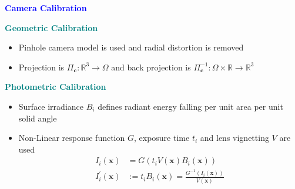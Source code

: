 \documentclass[aspectratio=169]{beamer}
\begin{document}
\begin{frame}{\textcolor{blue}{\textbf{Camera Calibration}}}
	\vspace{-0.5cm}
	
	\begin{block}{\textbf{\textcolor{teal}{Geometric Calibration}}}
	\begin{itemize}
			\item Pinhole camera model is used and radial distortion is removed
			\item Projection is $\Pi_{\mathbf{c}}: \mathbb{R}^3 \rightarrow \Omega$ and back projection is $\Pi_{\mathbf{c}}^{-1}: \Omega \times \mathbb{R} \rightarrow \mathbb{R}^3$
	\end{itemize}
	\end{block}

	\begin{block}{\textbf{\textcolor{teal}{Photometric Calibration}}}
	\begin{itemize}
			\item Surface irradiance $B_i$ defines radiant energy falling per unit area per unit solid angle
			\item Non-Linear response function $G$, exposure time $t_i$ and lens vignetting $V$ are used
			\begin{equation}
				\begin{aligned}
					I_i(\mathbf{x})&=G\left(t_i V(\mathbf{x}) B_i(\mathbf{x})\right)\\
					I_i^{\prime}(\mathbf{x})&:=t_i B_i(\mathbf{x})=\frac{G^{-1}\left(I_i(\mathbf{x})\right)}{V(\mathbf{x})}
				\end{aligned}
			\end{equation}
	\end{itemize}
	\end{block}

\end{frame}
\end{document}
